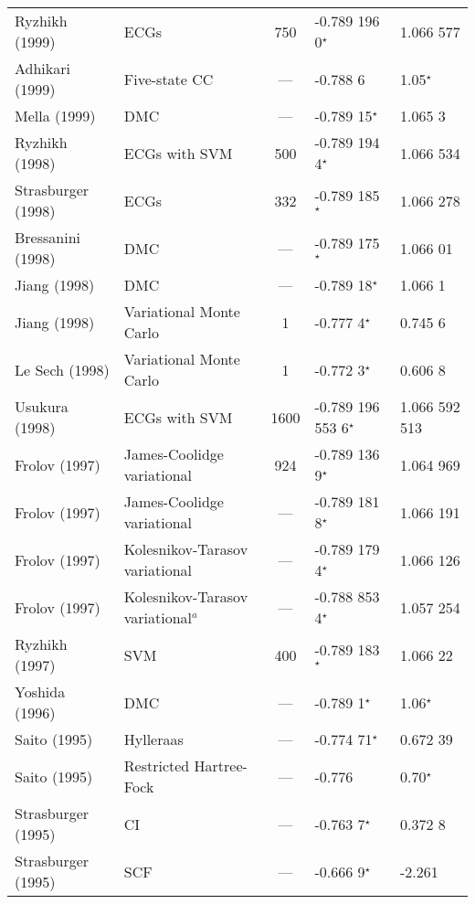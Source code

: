 \documentclass[Dissertation.tex]{subfiles}
\begin{document}
\begin{center}
\begin{longtable}{l l c l l}
Ryzhikh (1999) \cite{Ryzhikh1999} & ECGs & 750 & -0.789 196 0$^\star$ & 1.066 577 \\
Adhikari (1999) \cite{Adhikari1999} & Five-state CC & --- & -0.788 6 & 1.05$^\star$ \\
Mella (1999) \cite{Mella1999} & DMC & --- & -0.789 15$^\star$ & 1.065 3 \\
Ryzhikh (1998) \cite{Ryzhikh1998} & ECGs with SVM & 500 & -0.789 194 4$^\star$ & 1.066 534 \\
Strasburger (1998) \cite{Strasburger1998} & ECGs & 332 & -0.789 185$^\star$ & 1.066 278 \\
Bressanini (1998) \cite{Bressanini1998} & DMC & --- & -0.789 175$^\star$ & 1.066 01 \\
Jiang (1998) \cite{Jiang1998} & DMC & --- & -0.789 18$^\star$ & 1.066 1 \\
Jiang (1998) \cite{Jiang1998} & Variational Monte Carlo & 1 & -0.777 4$^\star$ & 0.745 6 \\
Le Sech (1998) \cite{LeSech1998} & Variational Monte Carlo & 1 & -0.772 3$^\star$ & 0.606 8 \\
Usukura (1998) \cite{Usukura1998} & ECGs with SVM & 1600 & -0.789 196 553 6$^\star$ & 1.066 592 513 \\
Frolov (1997) \cite{Frolov1997a} & James-Coolidge variational & 924 & -0.789 136 9$^\star$ & 1.064 969 \\
Frolov (1997) \cite{Frolov1997a} & James-Coolidge variational & --- & -0.789 181 8$^\star$ & 1.066 191 \\
Frolov (1997) \cite{Frolov1997c} & Kolesnikov-Tarasov variational & --- & -0.789 179 4$^\star$ & 1.066 126 \\
Frolov (1997) \cite{Frolov1997c} & Kolesnikov-Tarasov variational$^a$ & --- & -0.788 853 4$^\star$ & 1.057 254 \\
Ryzhikh (1997) \cite{Ryzhikh1997} & SVM & 400 & -0.789 183$^\star$ & 1.066 22 \\
Yoshida (1996) \cite{Yoshida1996} & DMC & --- & -0.789 1$^\star$ & 1.06$^\star$ \\
Saito (1995) \cite{Saito1995a} & Hylleraas & --- & -0.774 71$^\star$ & 0.672 39 \\*
Saito (1995) \cite{Saito1995} & Restricted Hartree-Fock & --- & -0.776 & 0.70$^\star$ \\*
Strasburger (1995) \cite{Strasburger1995} & CI & --- & -0.763 7$^\star$ & 0.372 8 \\*
Strasburger (1995) \cite{Strasburger1995} & SCF & --- & -0.666 9$^\star$ & -2.261 \\*

\end{longtable}
\end{center}
\end{document}
